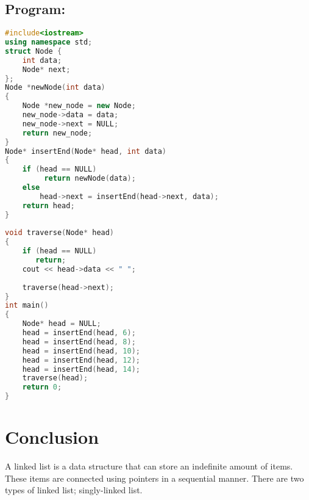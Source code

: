 \documentclass[11pt]{article}            %
\begin{document}
\subsection{Program:}     
\begin{lstlisting}[language=c++]
#include<iostream>
using namespace std;
struct Node {
    int data;
    Node* next;
};
Node *newNode(int data)
{
    Node *new_node = new Node;
    new_node->data = data;
    new_node->next = NULL;
    return new_node;
}
Node* insertEnd(Node* head, int data)
{
    if (head == NULL) 
         return newNode(data);
    else
        head->next = insertEnd(head->next, data);
    return head;
}
 
void traverse(Node* head)
{
    if (head == NULL)
       return;
    cout << head->data << " ";
 
    traverse(head->next);
}
int main()
{
    Node* head = NULL;
    head = insertEnd(head, 6);
    head = insertEnd(head, 8);
    head = insertEnd(head, 10);
    head = insertEnd(head, 12);
    head = insertEnd(head, 14);
    traverse(head);
    return 0;
}

\end{lstlisting}



\section{Conclusion}  
A linked list is a data structure that can store an indefinite amount of items. These items are connected using pointers in a sequential manner. There are two types of linked list; singly-linked list.


 
\end{document}
